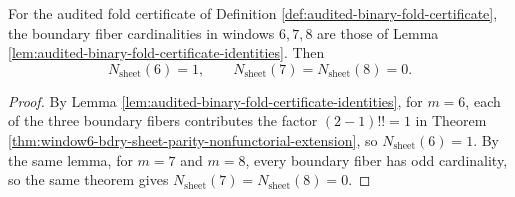 \begin{corollary}\label{cor:window6-bdry-sheet-parity-audited-counts}
For the audited fold certificate of Definition \ref{def:audited-binary-fold-certificate}, the boundary fiber cardinalities in windows \(6,7,8\) are those of Lemma \ref{lem:audited-binary-fold-certificate-identities}.
Then
\[
N_{\mathrm{sheet}}(6)=1,
\qquad
N_{\mathrm{sheet}}(7)=N_{\mathrm{sheet}}(8)=0.
\]
\end{corollary}

\begin{proof}
By Lemma \ref{lem:audited-binary-fold-certificate-identities}, for \(m=6\), each of the three boundary fibers contributes the factor \((2-1)!!=1\) in Theorem \ref{thm:window6-bdry-sheet-parity-nonfunctorial-extension}, so \(N_{\mathrm{sheet}}(6)=1\).
By the same lemma, for \(m=7\) and \(m=8\), every boundary fiber has odd cardinality, so the same theorem gives \(N_{\mathrm{sheet}}(7)=N_{\mathrm{sheet}}(8)=0\). \qedhere
\end{proof}


